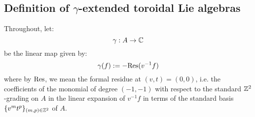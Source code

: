     \subsection{Definition of \texorpdfstring{$\gamma$}{}-extended toroidal Lie algebras}
        \begin{convention}
            Throughout, let:
                $$\gamma: A \to \mathbb{C}$$
            be the linear map given by:
                $$\gamma(f) := -\mathrm{Res}(v^{-1} f)$$
            where by $\mathrm{Res}$, we mean the formal residue at $(v, t) = (0, 0)$, i.e. the coefficients of the monomial of degree $(-1, -1)$ with respect to the standard $\mathbb{Z}^2$-grading on $A$ in the linear expansion of $v^{-1} f$ in terms of the standard basis $\{v^m t^p\}_{(m, p) \in \mathbb{Z}^2}$ of $A$. 
        \end{convention}
        
